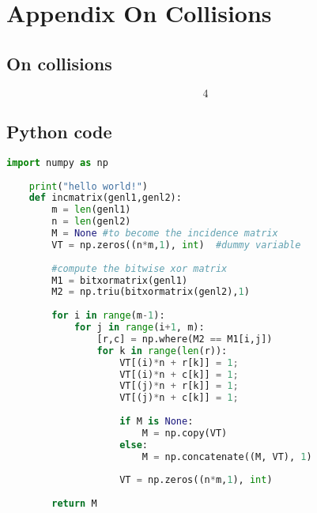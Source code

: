 \chapter{Appendix On Collisions}
\label{ch: appendix-collisions}

\section{On collisions}

\begin{equation}
4
\end{equation}

\section{Python code}



\renewcommand{\lstlistingname}{Fragmento de código}

\begin{lstlisting}[language=Python, caption=Python example, label=code:python_example]
    import numpy as np
        
    print("hello world!")
    def incmatrix(genl1,genl2):
        m = len(genl1)
        n = len(genl2)
        M = None #to become the incidence matrix
        VT = np.zeros((n*m,1), int)  #dummy variable
        
        #compute the bitwise xor matrix
        M1 = bitxormatrix(genl1)
        M2 = np.triu(bitxormatrix(genl2),1) 
    
        for i in range(m-1):
            for j in range(i+1, m):
                [r,c] = np.where(M2 == M1[i,j])
                for k in range(len(r)):
                    VT[(i)*n + r[k]] = 1;
                    VT[(i)*n + c[k]] = 1;
                    VT[(j)*n + r[k]] = 1;
                    VT[(j)*n + c[k]] = 1;
                    
                    if M is None:
                        M = np.copy(VT)
                    else:
                        M = np.concatenate((M, VT), 1)
                    
                    VT = np.zeros((n*m,1), int)
        
        return M
\end{lstlisting}